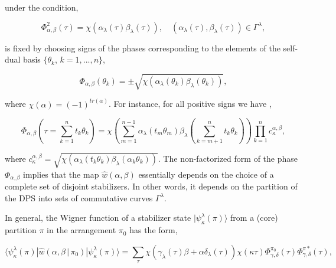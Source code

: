 \documentclass[quantumrep,article,submit,pdftex,moreauthors]{Definitions/mdpi}
\begin{document}
under the condition,

\begin{equation*}
  \Phi_{\alpha,\beta}^{2}(\tau)
  = \chi \left(
    \alpha_{\lambda}(\tau) \beta_{\lambda}(\tau )
  \right),
  \quad \left(\alpha_{\lambda}(\tau), \beta_{\lambda}(\tau)\right)
  \in \Gamma^{\lambda},
\end{equation*}

is fixed by choosing signs of the phases corresponding to the elements of
the self-dual basis $\{\theta _{k}$, $k=1,...,n\}$, 

\begin{equation}
\Phi _{\alpha ,\beta }(\theta _{k})=\pm \sqrt{\chi \left( \alpha _{\lambda
}(\theta _{k})\beta _{\lambda }(\theta _{k})\right) },
\label{Phib}
\end{equation}

where $\chi(\alpha) = (-1)^{tr(\alpha)}$. For instance, for all positive signs
we have \cite{klimov06},

\begin{equation}
  \Phi_{\alpha,\beta }\left(
    \tau = \sum\limits_{k=1}^{n} t_{k}\theta_{k}
  \right)
  = \chi\left(
    \sum\limits_{m=1}^{n-1}
    \alpha_{\lambda}(t_{m}\theta_{m})\beta_{\lambda}
    \left(\sum\limits_{k=m+1}^{n}t_{k}\theta_{k}\right)
  \right)
  \prod\limits_{k=1}^{n} c_{\kappa }^{\alpha,\beta},
  \label{Phi G}
\end{equation}

where $c_{\kappa}^{\alpha,\beta} =
\sqrt{\chi\left(\alpha_{\lambda}(t_{k}\theta_{k})
\beta_{\lambda}\left(\alpha_{k} \theta_{k}\right)\right)}$. The non-factorized
form of the phase $\Phi_{\alpha,\beta}$ implies that the map
$\hat{w}(\alpha,\beta)$ essentially depends on the
choice of a complete set of disjoint stabilizers. In other words, it depends
on the partition of the DPS into sets of commutative curves $\Gamma^{\lambda}$.

In general, the Wigner function of a stabilizer state
$|\psi_{\kappa}^{\lambda}(\pi)\rangle$ from a (core) partition $\pi$ in
the arrangement $\pi_{0}$ has the form, 

\begin{equation}
  \langle \psi_{\kappa}^{\lambda}(\pi)
  |\hat{w}\left(\alpha,\beta \, | \, \pi_{0}\right)
  |\psi_{\kappa}^{\lambda}(\pi)\rangle
  = \sum_{\tau} \chi\left(
    \gamma_{\lambda} (\tau) \beta + \alpha \delta_{\lambda}(\tau)
  \right) \chi(\kappa \tau)
  \Phi_{\gamma,\delta}^{\pi_{0}}(\tau)
  \Phi_{\gamma,\delta }^{\pi \ast}(\tau),
  \label{WF qubit}
\end{equation}
\end{document}
